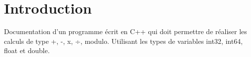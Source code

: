 \hypertarget{index_intro_sec}{}\section{Introduction}\label{index_intro_sec}
Documentation d'un programme écrit en C++ qui doit permettre de réaliser les calculs de type +, -\/, x, ÷, modulo. Utilisant les types de variables int32, int64, float et double.

\par
\par
 